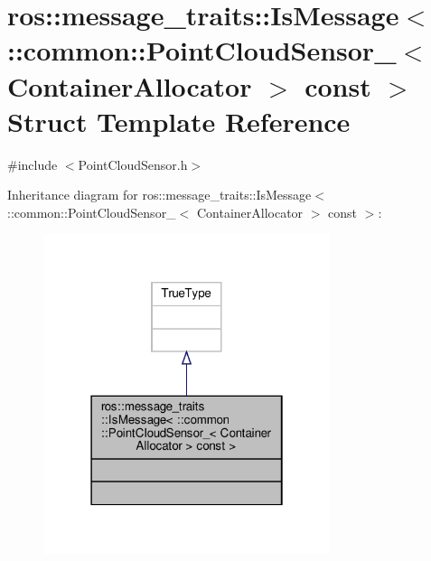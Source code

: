 \hypertarget{structros_1_1message__traits_1_1IsMessage_3_01_1_1common_1_1PointCloudSensor___3_01ContainerAllocator_01_4_01const_01_4}{}\section{ros\+:\+:message\+\_\+traits\+:\+:Is\+Message$<$ \+:\+:common\+:\+:Point\+Cloud\+Sensor\+\_\+$<$ Container\+Allocator $>$ const $>$ Struct Template Reference}
\label{structros_1_1message__traits_1_1IsMessage_3_01_1_1common_1_1PointCloudSensor___3_01ContainerAllocator_01_4_01const_01_4}


{\ttfamily \#include $<$Point\+Cloud\+Sensor.\+h$>$}



Inheritance diagram for ros\+:\+:message\+\_\+traits\+:\+:Is\+Message$<$ \+:\+:common\+:\+:Point\+Cloud\+Sensor\+\_\+$<$ Container\+Allocator $>$ const $>$\+:\nopagebreak
\begin{figure}[H]
\begin{center}
\leavevmode
\includegraphics[width=238pt]{dc/d61/structros_1_1message__traits_1_1IsMessage_3_01_1_1common_1_1PointCloudSensor___3_01ContainerAllof4384d806d547c40a3e2f951b40595e0}
\end{center}
\end{figure}


